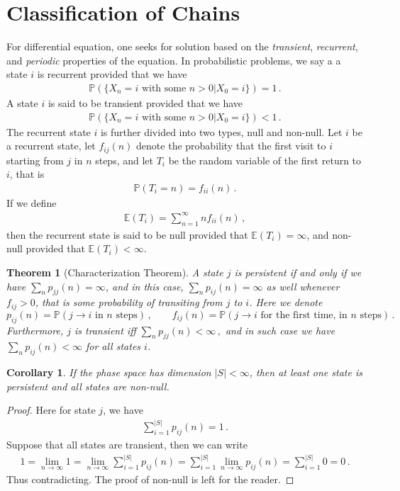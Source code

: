 \documentclass[11pt, onesided]{book}
\theoremstyle{break}
\theoremstyle{break}
\newtheorem{thm}{Theorem}[section]
\newtheorem{cor}{Corollary}[thm]
\begin{document}
\section[Classification of Chains]{\color{red}Classification of Chains\color{black}}
For differential equation, one seeks for solution based on the \textit{transient}, \textit{recurrent}, and \textit{periodic} properties of the equation. In probabilistic problems, we say a a state $i$ is recurrent provided that we have
\begin{align*}
\mathbb{P}\left(\{X_n = i \text{ with some }n>0 | X_0 = i\}\right) = 1\,.
\end{align*}
A state $i$ is said to be transient provided that we have
\begin{align*}
\mathbb{P}\left(\{X_n = i \text{ with some }n>0 | X_0 = i\}\right) < 1\,.
\end{align*}
The recurrent state $i$ is further divided into two types, null and non-null. Let $i$ be a recurrent state, let $f_{ij}(n)$ denote the probability that the first visit to $i$ starting from $j$ in $n$ steps, and let $T_i$ be the random variable of the first return to $i$, that is
\begin{align*}
\mathbb{P}(T_i = n) = f_{ii}(n)\,.
\end{align*}
If we define
\begin{align*}
\mathbb{E}(T_i) = \sum_{n=1}^\infty n f_{ii}(n)\,,
\end{align*}
then the recurrent state is said to be null provided that $\mathbb{E}(T_i )= \infty$, and non-null provided that $\mathbb{E}(T_i) < \infty$. 

\begin{thm}[Characterization Theorem]
A state $j$ is persistent if and only if we have $\sum_n p_{jj}(n) = \infty$, and in this case, $\sum_n p_{ij}(n) = \infty$ as well whenever $f_{ij}>0$, that is some probability of transiting from $j$ to $i$. Here we denote 
$$
p_{ij}(n) = \mathbb{P}(j \to i \text{ in $n$ steps})\,,\qquad
f_{ij}(n) = \mathbb{P}(j \to i \text{ for the first time, in $n$ steps})\,.
$$
Furthermore, $j$ is transient iff $
\sum_{n}p_{jj}(n) <\infty\,,$ and in such case we have $\sum_{n}p_{ij}(n) < \infty$ for all states $i$. 
\end{thm}


\begin{cor}
If the phase space has dimension $|S| < \infty$, then at least one state is persistent and all states are non-null. 
\end{cor}
\begin{proof}
Here for state $j$, we have
\begin{align*}
\sum_{i=1}^{|S|} p_{ij}(n) = 1\,.
\end{align*}
Suppose that all states are transient, then we can write
\begin{align*}
1 = \lim_{n\to \infty}1 = \lim_{n\to \infty}\sum_{i=1}^{|S|}p_{ij}(n) = \sum_{i=1}^{|S|}\lim_{n\to \infty}p_{ij}(n) = \sum_{i=1}^{|S|}  0 = 0\,.
\end{align*}
Thus contradicting. The proof of non-null is left for the reader.
\end{proof}
\end{document}
